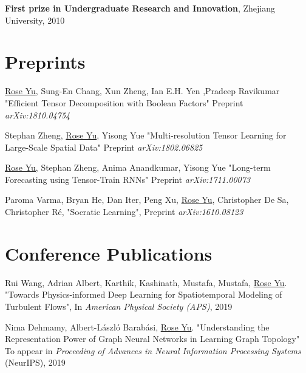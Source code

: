 \documentclass[margin,line]{res}
\begin{document}
\begin{resume}
\textbf{First prize in Undergraduate Research and Innovation}, Zhejiang University, 2010   





\section{\sc Preprints}
\begin{enumerate}[label={[P\arabic*]}]


\item \underline{Rose Yu}, Sung-En Chang, Xun Zheng, Ian E.H. Yen ,Pradeep Ravikumar
      "Efficient Tensor Decomposition with Boolean Factors"
      Preprint \textit{arXiv:1810.04754}
	
\item  Stephan Zheng, \underline{Rose Yu}, Yisong Yue
	"Multi-resolution Tensor Learning for Large-Scale Spatial Data"
	Preprint \textit{arXiv:1802.06825}
	
\item \underline{Rose Yu,} Stephan Zheng, Anima Anandkumar, Yisong Yue
"Long-term Forecasting using Tensor-Train RNNs"
Preprint \textit{arXiv:1711.00073}


\item Paroma Varma, Bryan He, Dan Iter, Peng Xu,  \underline{Rose Yu}, Christopher De Sa,  Christopher R\'e,  "Socratic Learning",
Preprint \textit{arXiv:1610.08123}
\end{enumerate}
\section{\sc Conference Publications}

\begin{enumerate}[label={[C\arabic*]}]
\item Rui Wang, Adrian Albert,  Karthik, Kashinath, Mustafa, Mustafa,  \underline{Rose Yu}. "Towards Physics-informed Deep Learning for Spatiotemporal Modeling of Turbulent Flows", In \textit{American Physical Society (APS)}, 2019


\item Nima Dehmamy, Albert-László Barabási, \underline{Rose Yu}.  "Understanding the Representation Power of Graph Neural Networks in Learning Graph Topology" To appear in \textit{Proceeding of Advances in Neural Information Processing Systems} (NeurIPS), 2019
 

\end{enumerate}
\end{resume}
\end{document}
